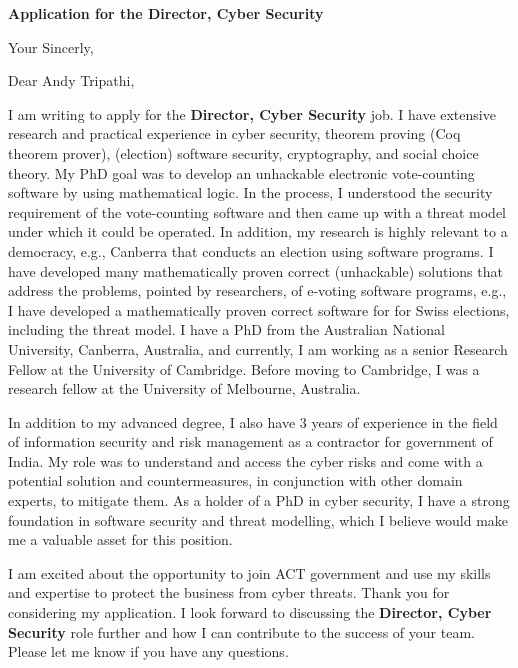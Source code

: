\documentclass[11pt,a4paper,roman]{moderncv}
\begin{document}
\date{}
\opening{\textbf{Application for the Director, Cyber Security}}
\closing{Your Sincerly, \vspace{-1em}}



\makelettertitle

Dear Andy Tripathi, 

I am writing to apply
for the \textbf{Director, Cyber Security} job. 
I have extensive research and practical experience in cyber security, 
theorem proving (Coq theorem prover), (election) software security, cryptography,  
and social choice theory. My PhD goal was to develop an unhackable 
electronic vote-counting software by using mathematical logic.
In the process, I understood the security requirement of 
the vote-counting software and then came up with a threat model under 
which it could be operated. In addition,  my research is highly 
relevant to a democracy, e.g., Canberra that conducts 
an election using software programs. I have developed many 
mathematically proven correct (unhackable)  
solutions that address the problems, pointed by researchers, 
of e-voting software programs, e.g.,
I have developed a mathematically proven correct software for
for Swiss elections, including the threat model.
I have a PhD from the Australian National University, Canberra, Australia,
and currently, I am working as a senior Research Fellow at the University of 
Cambridge. Before moving to Cambridge, I was a 
research fellow at the University of Melbourne, Australia.


In addition to my advanced degree, I also have 3 
years of experience in the field of information security 
and risk management as a contractor for government of India. 
My role was to understand and access the cyber risks and 
come with a potential solution and countermeasures, in conjunction with 
other domain experts, to mitigate them.
As a holder of a PhD in cyber security, I have a 
strong foundation 
in software security and threat modelling, which I believe would make me a 
valuable asset for this position.


I am excited about the opportunity to join ACT government and use my skills 
and expertise to protect the business from cyber threats. 
Thank you for considering my application. I look forward to discussing 
the \textbf{Director, Cyber Security} role further and how I 
can contribute to the 
success of your team. Please let me know if you have any questions. \\
 

\vspace{0.5cm}


\makeletterclosing
\end{document}
